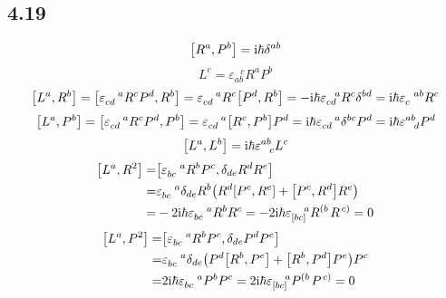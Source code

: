 \subsection{4.19}
\begin{framed}
    \[
    \qty[R^{a}, P^{b}] = \mathrm{i} \hbar \delta^{ab}
    \] \[
    L^{c} = \varepsilon_{a b}^{\ \ \ c} R^{a} P^{b}
    \] \[
    \qty[L^{a}, R^{b}] = \qty[\varepsilon_{c d}^{\ \ \ a} R^{c} P^{d}, R^{b}] = \varepsilon_{c d}^{\ \ \ a} R^{c} \qty[P^{d}, R^{b}] = - \mathrm{i} \hbar \varepsilon_{c d}^{\ \ a} R^c \delta^{bd} = \mathrm{i} \hbar \varepsilon_{c}^{\ \ ab} R^c
    \] \[
    \qty[L^{a}, P^{b}] = \qty[\varepsilon_{c d}^{\ \ \ a} R^{c} P^{d}, P^{b}] = \varepsilon_{c d}^{\ \ \ a} \qty[R^{c}, P^{b}] P^{d} = \rmi \hbar \varepsilon_{c d}^{\ \ \ a} \delta^{b c} P^{d} = \rmi \hbar \varepsilon^{a b}_{\ \ d} P^{d}
    \] \[
    \qty[L^a, L^b] = \rmi \hbar \varepsilon^{a b}_{\ \ c} L^{c}
    \] \begin{align*}
        \qty[L^a, R^2] = & \qty[\varepsilon_{b c}^{\ \ \ a} R^b P^c, \delta_{d e} R^d R^e]\\
        = & \varepsilon_{b c}^{\ \ \ a} \delta_{d e} R^{b} \qty(R^d \qty[P^c, R^e] + \qty[P^c, R^d] R^e)\\
        = & -2 \mathrm{i} \hbar \varepsilon_{b c}^{\ \ \ a} R^b R^c = -2 \mathrm{i} \hbar \varepsilon_{\qty[b c]}^{\ \ \ a} R^{\left( b \right.} R^{\left. c \right)} = 0
    \end{align*} \begin{align*}
        \qty[L^a, P^2] = & \qty[\varepsilon_{b c}^{\ \ \ a} R^b P^c, \delta_{d e} P^d P^e]\\
        = & \varepsilon_{b c}^{\ \ \ a} \delta_{d e} \qty(P^d \qty[R^b, P^e] + \qty[R^b, P^d] P^e) P^c\\
        = & 2 \mathrm{i} \hbar \varepsilon_{bc}^{\ \ \ a} P^{b} P^{c} = 2 \mathrm{i} \hbar \varepsilon_{\qty[bc]}^{\ \ \ a} P^{\left( b \right.} P^{\left. c \right)} = 0
    \end{align*}
\end{framed}

